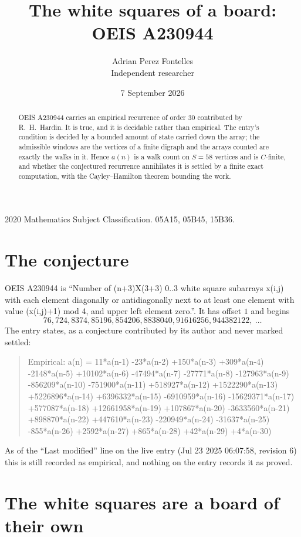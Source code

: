 \documentclass[11pt,a4paper]{article}
\title{The white squares of a board: OEIS A230944}
\author{Adrian Perez Fontelles\\ \small Independent researcher}
\date{7 September 2026}
\theoremstyle{plain}
\theoremstyle{definition}
\begin{document}
\maketitle

\begin{abstract}
OEIS A230944 carries an empirical recurrence of order $30$ contributed by R.~H.~Hardin. It is
true, and it is decidable rather than empirical. The entry's condition is decided by a bounded amount of state carried down the array; the
admissible windows are the vertices of a finite digraph and the arrays counted are exactly the
walks in it. Hence $a(n)$ is a walk count on $S=58$ vertices and is $C$-finite, and whether the
conjectured recurrence annihilates it is settled by a finite exact computation, with the
Cayley--Hamilton theorem bounding the work.
\end{abstract}

\noindent\small 2020 Mathematics Subject Classification. 05A15, 05B45, 15B36.\normalsize

\section{The conjecture}

OEIS A230944 is ``Number of (n+3)X(3+3) 0..3 white square subarrays x(i,j) with each element diagonally or antidiagonally next to at least one element with value (x(i,j)+1) mod 4, and upper left element zero.''. It has offset $1$ and begins
\[
76, 724, 8374, 85196, 854206, 8838040, 91616256, 944382122,\ \dots
\]
The entry states, as a conjecture contributed by its author and never marked settled:
\begin{quote}
Empirical: a(n) = 11*a(n-1) -23*a(n-2) +150*a(n-3) +309*a(n-4) -2148*a(n-5) +10102*a(n-6) -47494*a(n-7) -27771*a(n-8) -127963*a(n-9) -856209*a(n-10) -751900*a(n-11) +518927*a(n-12) +1522290*a(n-13) +5226896*a(n-14) +6396332*a(n-15) -6910959*a(n-16) -15629371*a(n-17) +577087*a(n-18) +12661958*a(n-19) +107867*a(n-20) -3633560*a(n-21) +898870*a(n-22) +447610*a(n-23) -220949*a(n-24) -31637*a(n-25) -855*a(n-26) +2592*a(n-27) +865*a(n-28) +42*a(n-29) +4*a(n-30)
\end{quote}
As of the ``Last modified'' line on the live entry (Jul 23 2025 06:07:58, revision 6) this is still
recorded as empirical, and nothing on the entry records it as proved.

\section{The white squares are a board of their own}
\end{document}
